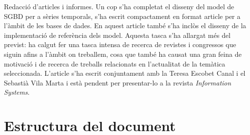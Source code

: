 Redacció d'articles i informes. Un cop s'ha completat
  el disseny del model de SGBD per a sèries temporals, s'ha escrit
  compactament en format article per a l'àmbit de les bases de dades.
  En aquest article també s'ha inclòs el disseny de la implementació
  de referència dels model.  Aquesta tasca s'ha allargat més del
  previst: ha calgut fer una tasca intensa de recerca de revistes i
  congressos que siguin afins a l'àmbit on treballem, cosa que també
  ha causat una gran feina de motivació i de recerca de treballs
  relacionats en l'actualitat de la temàtica seleccionada.  L'article
  s'ha escrit conjuntament amb la Teresa Escobet Canal i el Sebastià
  Vila Marta i està pendent per presentar-lo a la revista
  \emph{Information Systems}.















\section{Estructura del document}













